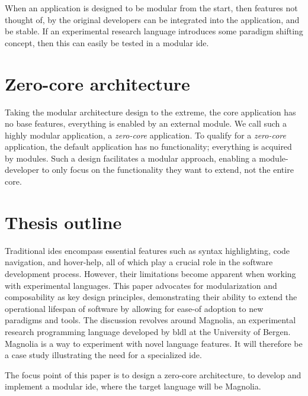 \begin{hyp} \label{hyp:modular}
  When an application is designed to be modular from the start, then features
  not thought of, by the original developers can be integrated into the
  application, and be stable. If an experimental research language introduces
  some paradigm shifting concept, then this can easily be tested in a modular
  \gls*{ide}.
\end{hyp}


\section{Zero-core architecture}

Taking the modular architecture design to the extreme, the core application has
no base features, everything is enabled by an external module. We call such a
highly modular application, a \textit{zero-core} application. To qualify for a
\textit{zero-core} application, the default application has no functionality;
everything is acquired by modules. Such a design facilitates a modular approach,
enabling a module-developer to only focus on the functionality they want to
extend, not the entire core.

\section{Thesis outline}

Traditional \gls*{ide}s encompass essential features such as syntax highlighting,
code navigation, and hover-help, all of which play a crucial role in the
software development process. However, their limitations become apparent when
working with experimental languages. This paper advocates for modularization and
composability as key design principles, demonstrating their ability to extend
the operational lifespan of software by allowing for ease-of adoption to new
paradigms and tools. The discussion revolves around Magnolia, an experimental
research programming language developed by \gls*{bldl} at the University of
Bergen. Magnolia is a way to experiment with novel language features. It will
therefore be a case study illustrating the need for a specialized \gls*{ide}.

The focus point of this paper is to design a zero-core architecture, to develop
and implement a modular \gls*{ide}, where the target language will be Magnolia.

